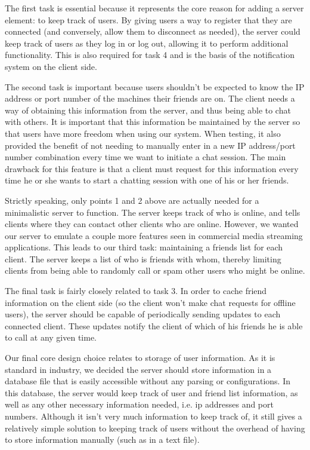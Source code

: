 The first task is essential because it represents the core reason for adding a server element: to keep track of users. By giving users a way to register that they are connected (and conversely, allow them to disconnect as needed), the server could keep track of users as they log in or log out, allowing it to perform additional functionality. This is also required for task 4 and is the basis of the notification system on the client side. 

The second task is important because users shouldn't be expected to know the IP address or port number of the machines their friends are on. The client needs a way of obtaining this information from the server, and thus being able to chat with others. It is important that this information be maintained by the server so that users have more freedom when using our system. When testing, it also provided the benefit of not needing to manually enter in a new IP address/port number combination every time we want to initiate a chat session. The main drawback for this feature is that a client must request for this information every time he or she wants to start a chatting session with one of his or her friends.

Strictly speaking, only points 1 and 2 above are actually needed for a minimalistic server to function. The server keeps track of who is online, and tells clients where they can contact other clients who are online. However, we wanted our server to emulate a couple more features seen in commercial media streaming applications. This leads to our third task: maintaining a friends list for each client.
The server keeps a list of who is friends with whom, thereby limiting clients from being able to randomly call or spam other users who might be online.

The final task is fairly closely related to task 3. In order to cache friend information on the client side (so the client won't make chat requests for offline users), the server should be capable of periodically sending updates to each connected client. These updates notify the client of which of his friends he is able to call at any given time.

Our final core design choice relates to storage of user information. As it is standard in industry, we decided the server should store information in a database file that is easily accessible without any parsing or configurations. In this database, the server would keep track of user and friend list information, as well as any other necessary information needed, i.e. ip addresses and port numbers. Although it isn't very much information to keep track of, it still gives a relatively simple solution to keeping track of users without the overhead of having to store information manually (such as in a text file).
 
